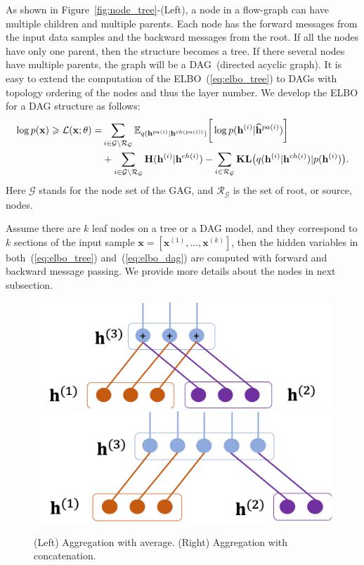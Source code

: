 \documentclass{article} %
\newcommand{\belhal}[1]{{\color{red}{\bf\sf [BK: #1]}}}
\begin{document}
As shown in Figure~\ref{fig:node_tree}-(Left), a node in a flow-graph can have multiple children and multiple parents.
Each node has the forward messages from the input data samples and the backward messages from the root.  
If all the nodes have only one parent, then the structure becomes a tree. 
If there several nodes have multiple parents, the graph will be a DAG~(directed acyclic graph). 
It is easy to extend the computation of the ELBO~(\ref{eq:elbo_tree}) to DAGs with topology ordering  of the nodes and thus the layer number. 
We develop the ELBO for a DAG structure as follows:
\begin{align}  \notag
 \log p(\mathbf{x}) \geqslant \mathcal{L}(\mathbf{x}; \theta) 
= &  \sum_{i \in \mathcal{G}  \setminus  \mathcal{R}_{ \mathcal{G} }  }  \mathbb{E}_{q(\mathbf{h}^{pa(i)}|\mathbf{h}^{ch(pa(i))})} \bigg[ \log p( \mathbf{h}^{(i)}|  \widehat{\mathbf{h}}^{pa(i)})   \bigg]\\
 & +  \sum_{i \in \mathcal{G}  \setminus  \mathcal{R}_{ \mathcal{G} }  } \textbf{\text{H}}(\mathbf{h}^{(i)} | \mathbf{h}^{ch(i)} )   -    \sum_{i \in  \mathcal{R}_{ \mathcal{G} }  }  \textbf{\text{KL}}\big(q(\mathbf{h}^{(i)} | \mathbf{h}^{ch(i)} )   | p(\mathbf{h}^{(i)})  \big) . \label{eq:elbo_dag}
 \end{align}
Here $\mathcal{G}$ stands for the node set of the GAG, and $\mathcal{R}_{ \mathcal{G}}$ is the set of root, or source, nodes. 

Assume there are $k$ leaf nodes on a tree or a DAG model, and they correspond to $k$ sections of the input sample $\mathbf{x} = [\mathbf{x}^{(1)}, ..., \mathbf{x}^{(k)}]$, then the hidden variables in both~(\ref{eq:elbo_tree}) and~(\ref{eq:elbo_dag}) are computed with forward and backward message passing. 
We provide more details about the nodes in next subsection.
 
\begin{figure}[!htbp] %
\begin{center}
 \includegraphics[width=0.43\linewidth]{fig/node_aggre_sum.png}
 \includegraphics[width=0.43\linewidth]{fig/node_aggre_cat.png}
\end{center}
   \caption{(Left) Aggregation with average. (Right) Aggregation with concatenation. }
\label{fig:node_aggre}
\end{figure}
\end{document}
